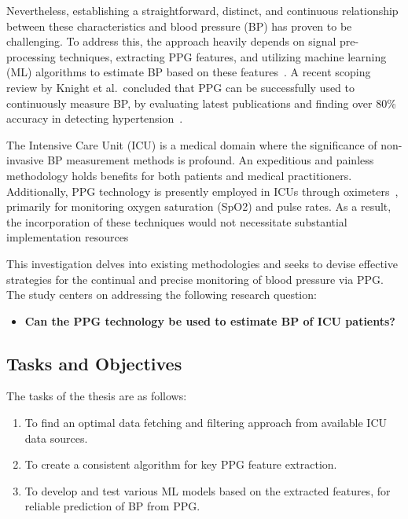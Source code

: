 Nevertheless, establishing a straightforward, distinct, and continuous relationship between these characteristics and blood pressure (BP) has proven to be challenging.
To address this, the approach heavily depends on signal pre-processing techniques, extracting PPG features, and utilizing machine learning (ML) algorithms to estimate BP based on these features~\cite{el-hajjDeepLearningModels2021}.
A recent scoping review by Knight et al.\ concluded that PPG can be successfully used to continuously measure BP, by evaluating latest publications and finding over 80\% accuracy in detecting hypertension~\cite{knightAccuracyWearablePhotoplethysmography2022}.

The Intensive Care Unit (ICU) is a medical domain where the significance of non-invasive BP measurement methods is profound.
An expeditious and painless methodology holds benefits for both patients and medical practitioners.
Additionally, PPG technology is presently employed in ICUs through oximeters~\cite{aoyagiPulseOximetryIts2002}, primarily for monitoring oxygen saturation (SpO2) and pulse rates.
As a result, the incorporation of these techniques would not necessitate substantial implementation resources

\vspace{0.2cm}

This investigation delves into existing methodologies and seeks to devise effective strategies for the continual and precise monitoring of blood pressure via PPG\@.
The study centers on addressing the following research question:

\begin{itemize}
    \item \textbf{Can the PPG technology be used to estimate BP of ICU patients?}
\end{itemize}

\subsection{Tasks and Objectives}
\label{subsec:tasks_objectives}

The tasks of the thesis are as follows:

\begin{enumerate}
    \item To find an optimal data fetching and filtering approach from available ICU data sources.
    \item To create a consistent algorithm for key PPG feature extraction.
    \item To develop and test various ML models based on the extracted features, for reliable prediction of BP from PPG\@.
\end{enumerate}

